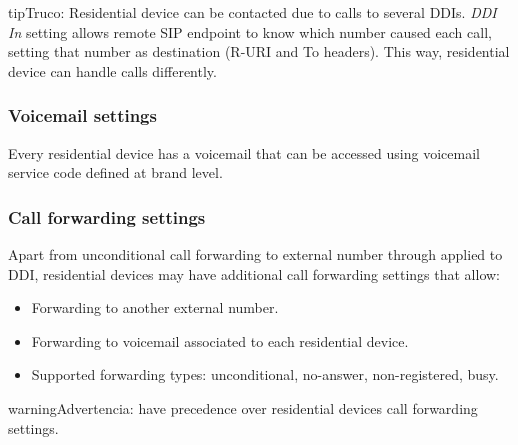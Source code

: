 \documentclass[letterpaper,10pt,spanish]{sphinxmanual}
\begin{document}
\begin{notice}{tip}{Truco:}
Residential device can be contacted due to calls to several DDIs. \emph{DDI In} setting allows remote SIP endpoint to
know which number caused each call, setting that number as destination (R-URI and To headers). This way, residential
device can handle calls differently.
\end{notice}


\subsubsection{Voicemail settings}
\label{administration_portal/client/residential/residential_devices:voicemail-settings}
Every residential device has a voicemail that can be accessed using voicemail service code defined at brand level.


\subsubsection{Call forwarding settings}
\label{administration_portal/client/residential/residential_devices:residential-devices-cfw}\label{administration_portal/client/residential/residential_devices:call-forwarding-settings}
Apart from unconditional call forwarding to external number through {\hyperref[administration_portal/client/vpbx/routing_tools/external_call_filters:external\string-call\string-filters]{}} applied to DDI,
residential devices may have additional call forwarding settings that allow:
\begin{itemize}
\item {} 
Forwarding to another external number.

\item {} 
Forwarding to voicemail associated to each residential device.

\item {} 
Supported forwarding types: unconditional, no-answer, non-registered, busy.

\end{itemize}

\begin{notice}{warning}{Advertencia:}
{\hyperref[administration_portal/client/vpbx/routing_tools/external_call_filters:external\string-call\string-filters]{}} have precedence over residential devices call forwarding settings.
\end{notice}
\end{document}
